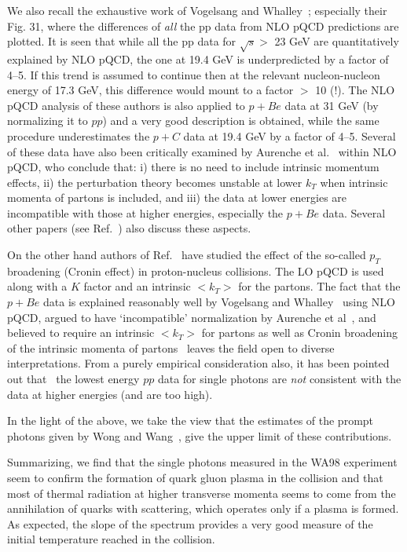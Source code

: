 We also recall the exhaustive work of 
Vogelsang and Whalley~\cite{pqcd}; especially their Fig. 31,
where the differences of {\em all} the pp data from NLO pQCD predictions are 
plotted.  It is seen that while all the pp data for $\sqrt{s} >$ 23 GeV
are quantitatively explained by  NLO pQCD, the one at 19.4 GeV
 is underpredicted by a factor of 4--5. If this trend is assumed 
to continue then at the relevant nucleon-nucleon energy of 17.3 GeV,
this difference would mount to a factor $>$ 10 (!). The NLO pQCD
analysis of these authors is  also applied to $p+Be$ data at 31 GeV
(by normalizing it to $pp$) and a very good description is obtained,
while the same procedure underestimates the $p+C$ data at 19.4 GeV
by a factor of 4--5. Several of these data have also been critically
examined by Aurenche et al.~\cite{aur2} within NLO pQCD, 
who conclude that: i) there
is no need to include intrinsic momentum effects, ii) the perturbation
theory becomes unstable at lower $k_T$ when intrinsic momenta of partons
is included, and iii) the data at lower energies are 
incompatible with those at higher energies, especially the $p+Be$
data. Several other papers (see Ref.~\cite{aur2}) also discuss
these aspects. 

On the other hand authors of Ref.~\cite{papp} have studied the effect
of the so-called $p_T$ broadening (Cronin effect) in 
proton-nucleus collisions. The LO pQCD is used
along with  a $K$ factor and an intrinsic $<k_T>$ for the partons. 
The fact that the $p+Be$ data is explained reasonably well by Vogelsang
and Whalley~\cite{pqcd} using NLO pQCD, argued to have `incompatible'
normalization by Aurenche et al~\cite{aur2}, and believed to require
an intrinsic $<k_T>$ for partons as well as Cronin broadening of the
intrinsic momenta of partons~\cite{papp} leaves the field open to 
diverse interpretations.  From a purely empirical consideration also,
 it has been pointed out that~\cite{dks_scal}
the lowest energy $pp$ data for single photons are {\em not} consistent
 with the data at higher energies (and are too high).

In the light of the above, we take the view that the estimates of the
prompt photons given by Wong and Wang~\cite{wong}, give the
upper limit of these contributions.

Summarizing, we find that the single photons measured in the WA98 experiment
seem to confirm the formation of quark gluon plasma in the collision and
that  most of thermal radiation at higher transverse momenta
 seems to come from the annihilation of
quarks with scattering, which operates only if a plasma is formed.
As expected, the slope of the spectrum provides a very good measure
of the initial temperature reached in the collision.

